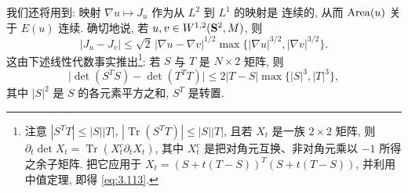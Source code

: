 我们还将用到: 映射 $\nabla u\mapsto J_u$ 作为从 $L^2$ 到 $L^1$ 的映射是
连续的, 从而 $\operatorname{Area}(u)$ 关于 $E(u)$ 连续. 确切地说, 若
$u,v\in W^{1,2}(\mathbf{S}^2,M)$, 则
\begin{equation}
|J_u-J_v|\leq\sqrt2\,|\nabla u-\nabla v|^{1/2}
 \max\bigl\{|\nabla u|^{3/2},|\nabla v|^{3/2}\bigr\}.
\label{eq:3.112}
\end{equation}
这由下述线性代数事实推出\footnote{注意 $|S^TT|\leq|S||T|$,
$|\operatorname{Tr}(S^TT)|\leq|S||T|$, 且若 $X_t$ 是一族 $2\times2$ 矩阵,
则 $\partial_t\det X_t=\operatorname{Tr}(X_t^c\partial_tX_t)$, 其中
$X_t^c$ 是把对角元互换、非对角元乘以 $-1$ 所得之余子矩阵. 把它应用于
$X_t=(S+t(T-S))^T(S+t(T-S))$, 并利用中值定理, 即得 \eqref{eq:3.113}.}:
若 $S$ 与 $T$ 是 $N\times2$ 矩阵, 则
\begin{equation}
\bigl|\det(S^TS)-\det(T^TT)\bigr|
 \leq2|T-S|\max\{|S|^3,|T|^3\},
\label{eq:3.113}
\end{equation}
其中 $|S|^2$ 是 $S$ 的各元素平方之和, $S^T$ 是转置.

